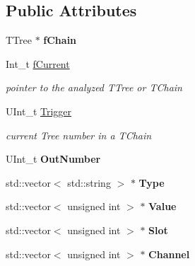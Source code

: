 \subsection*{Public Attributes}
\begin{DoxyCompactItemize}
\item 
\hypertarget{classMRDTree_a73df1663124477ad3347f5a894801079}{T\-Tree $\ast$ {\bfseries f\-Chain}}\label{classMRDTree_a73df1663124477ad3347f5a894801079}

\item 
\hypertarget{classMRDTree_ae34a2e8a27b9deafeb5d28677c4fe090}{Int\-\_\-t \hyperlink{classMRDTree_ae34a2e8a27b9deafeb5d28677c4fe090}{f\-Current}}\label{classMRDTree_ae34a2e8a27b9deafeb5d28677c4fe090}

\begin{DoxyCompactList}\small\item\em pointer to the analyzed T\-Tree or T\-Chain \end{DoxyCompactList}\item 
\hypertarget{classMRDTree_acbb905703b5bd9054df1c685fce4c340}{U\-Int\-\_\-t \hyperlink{classMRDTree_acbb905703b5bd9054df1c685fce4c340}{Trigger}}\label{classMRDTree_acbb905703b5bd9054df1c685fce4c340}

\begin{DoxyCompactList}\small\item\em current Tree number in a T\-Chain \end{DoxyCompactList}\item 
\hypertarget{classMRDTree_ad3a57b2d0d73f13d4fc46d8c3e0c0db8}{U\-Int\-\_\-t {\bfseries Out\-Number}}\label{classMRDTree_ad3a57b2d0d73f13d4fc46d8c3e0c0db8}

\item 
\hypertarget{classMRDTree_aad0e5fe201d44d17706919f231f23b6f}{std\-::vector$<$ std\-::string $>$ $\ast$ {\bfseries Type}}\label{classMRDTree_aad0e5fe201d44d17706919f231f23b6f}

\item 
\hypertarget{classMRDTree_ad30e310155b90d3d76025fba93cb1082}{std\-::vector$<$ unsigned int $>$ $\ast$ {\bfseries Value}}\label{classMRDTree_ad30e310155b90d3d76025fba93cb1082}

\item 
\hypertarget{classMRDTree_ad8a1fdd22f8e261bcc10527ae89aabc3}{std\-::vector$<$ unsigned int $>$ $\ast$ {\bfseries Slot}}\label{classMRDTree_ad8a1fdd22f8e261bcc10527ae89aabc3}

\item 
\hypertarget{classMRDTree_a4275330c81a0e7d017c473e88275dbc7}{std\-::vector$<$ unsigned int $>$ $\ast$ {\bfseries Channel}}\label{classMRDTree_a4275330c81a0e7d017c473e88275dbc7}


\end{DoxyCompactItemize}
